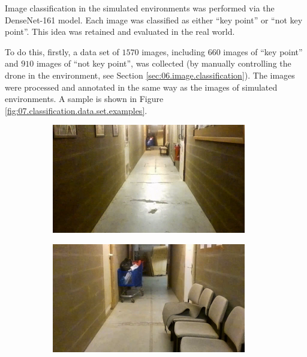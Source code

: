 Image classification in the simulated environments was performed via the DenseNet-161 model. Each image was classified as either \enquote{key point} or \enquote{not key point}. This idea was retained and evaluated in the real world.

To do this, firstly, a data set of $\num{1570}$ images, including $\num{660}$ images of \enquote{key point} and $\num{910}$ images of \enquote{not key point}, was collected (by manually controlling the drone in the environment, see Section \ref{sec:06.image.classification}). The images were processed and annotated in the same way as the images of simulated environments. A sample is shown in Figure \ref{fig:07.classification.data.set.examples}.

\begin{figure}[H]
    \centering
    \begin{subfigure}{0.32\textwidth}
        \centering
        \includegraphics[width=\textwidth]{resources/png/07/classification/datasets/0.png}
        \vspace{0.5em}
    \end{subfigure}
    \hfill
    \begin{subfigure}{0.32\textwidth}
        \centering
        \includegraphics[width=\textwidth]{resources/png/07/classification/datasets/1.png}

\end{subfigure}
\end{figure}
